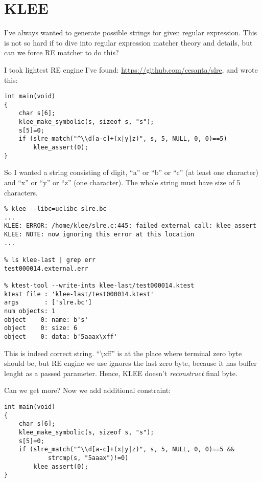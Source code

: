 \section{KLEE}

I've always wanted to generate possible strings for given regular expression.
This is not so hard if to dive into regular expression matcher theory and details, but can we force RE matcher to do this?

I took lightest RE engine I've found: \url{https://github.com/cesanta/slre}, and wrote this:

\begin{lstlisting}
int main(void)
{
	char s[6];
	klee_make_symbolic(s, sizeof s, "s");
	s[5]=0;
	if (slre_match("^\\d[a-c]+(x|y|z)", s, 5, NULL, 0, 0)==5)
		klee_assert(0);
}
\end{lstlisting}

So I wanted a string consisting of digit, ``a'' or ``b'' or ``c'' (at least one character) and ``x'' or ``y'' or ``z'' (one character).
The whole string must have size of 5 characters.

\begin{lstlisting}
% klee --libc=uclibc slre.bc
...
KLEE: ERROR: /home/klee/slre.c:445: failed external call: klee_assert
KLEE: NOTE: now ignoring this error at this location
...

% ls klee-last | grep err
test000014.external.err

% ktest-tool --write-ints klee-last/test000014.ktest
ktest file : 'klee-last/test000014.ktest'
args       : ['slre.bc']
num objects: 1
object    0: name: b's'
object    0: size: 6
object    0: data: b'5aaax\xff'
\end{lstlisting}

This is indeed correct string. ``\textbackslash{}xff'' is at the place where terminal zero byte should be, but RE engine we use ignores the last zero byte, because it has buffer lenght as a passed parameter.
Hence, KLEE doesn't \textit{reconstruct} final byte.

Can we get more?
Now we add additional constraint:

\begin{lstlisting}
int main(void)
{
	char s[6];
	klee_make_symbolic(s, sizeof s, "s");
	s[5]=0;
	if (slre_match("^\\d[a-c]+(x|y|z)", s, 5, NULL, 0, 0)==5 &&
			strcmp(s, "5aaax")!=0)
		klee_assert(0);
}
\end{lstlisting}

